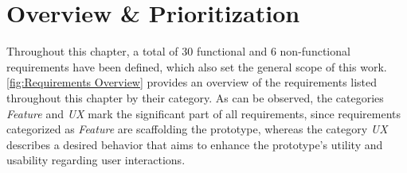 \section{Overview \& Prioritization}\label{sec:Requirements Overview}

Throughout this chapter, a total of 30 functional and 6 non-functional requirements have been defined, which also set the general scope of this work. \autoref{fig:Requirements Overview} provides an overview of the requirements listed throughout this chapter by their category. As can be observed, the categories \textit{Feature} and \textit{\acrshort*{UX}} mark the significant part of all requirements, since requirements categorized as \textit{Feature} are scaffolding the prototype, whereas the category \textit{\acrshort*{UX}} describes a desired behavior that aims to enhance the prototype’s utility and usability regarding user interactions.


